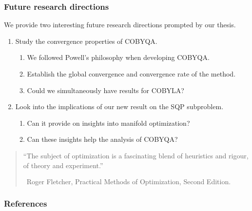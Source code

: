 \documentclass{polyu-presentation}
\begin{document}
\begin{frame}
    \frametitle{Future research directions}

    We provide two interesting future research directions prompted by our thesis.
    \begin{enumerate}
        \item Study the \alert{convergence} properties of COBYQA.
        \begin{enumerate}
            \item We followed Powell's philosophy when developing COBYQA.
            \item Establish the global convergence and convergence rate of the method.
            \item Could we simultaneously have results for COBYLA?
        \end{enumerate}
        \item Look into the \alert{implications} of our new result on the SQP subproblem.
        \begin{enumerate}
            \item Can it provide on insights into \alert{manifold optimization}?
            \item Can these insights help the analysis of COBYQA?
        \end{enumerate}
    \end{enumerate}

    \smallskip

    \begin{block}{}
        \begin{quote}
            \enquote{The subject of optimization is a fascinating blend of heuristics and rigour, of theory and experiment.}

            \smallskip

            {\hfill\small\textemdash\ {\normalfont Roger Fletcher}, Practical Methods of Optimization, Second Edition.}
        \end{quote}
    \end{block}
\end{frame}

\appendix

\begin{frame}[t,allowframebreaks]
    \frametitle{References}

	\printbibliography
\end{frame}
\end{document}
